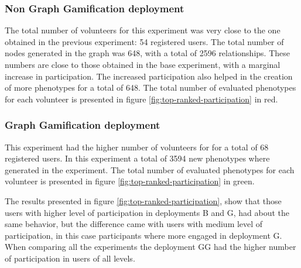 \documentclass[conference]{IEEEtran}
\begin{document}
\subsubsection{ Non Graph Gamification deployment}
The total number of volunteers for this experiment was very close to
the one obtained in the previous
experiment: 54 registered users. The total number of nodes generated in the graph was 648, 
with a total of 2596 relationships. These numbers are close to those obtained in the base experiment,
with a marginal increase in participation. The increased participation also helped in the creation of
more phenotypes for a total of 648. The total number of evaluated
phenotypes for each volunteer is presented in figure \ref{fig:top-ranked-participation} in red. 

\subsubsection{ Graph Gamification deployment}
This experiment had the higher number of volunteers for for a total of 68 registered users. 
In this experiment a total of 3594 new phenotypes where generated in the experiment. 
The total number of evaluated phenotypes for each volunteer is presented in figure 
\ref{fig:top-ranked-participation} in green. 

The results presented in figure \ref{fig:top-ranked-participation}, show that those users with
higher level of participation in deployments B and G, had about the same behavior, but the difference
came with users with medium level of participation, in this case participants where more engaged in deployment
G. When comparing all the experiments the deployment GG had the higher number of participation in users
of all levels.    
\end{document}
